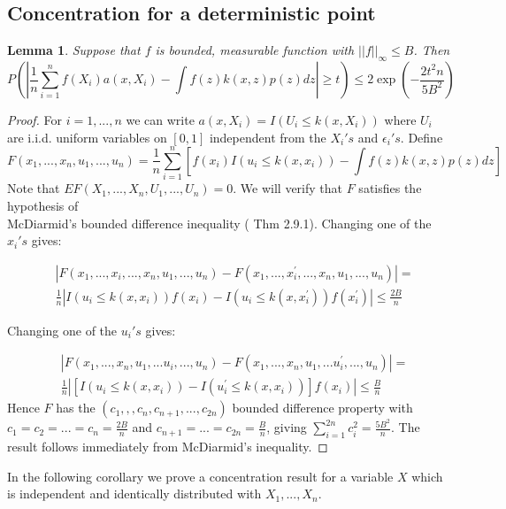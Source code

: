 \documentclass{article}
\newtheorem{lemma}[theorem]{Lemma}
\begin{document}
\subsection{Concentration for a deterministic point}
\label{conc_det_pt}

\begin{lemma}
\label{basic_lemma_1}
Suppose that $f$ is bounded, measurable function with  $||f||_{\infty}\leq B$. Then 
\begin{equation*}
P(|\frac{1}{n}\sum_{i=1}^n f(X_i)a(x,X_i)-\int f(z)k(x,z)p(z)dz|\geq t)\leq 2\exp(-\frac{2t^2n}{5B^2})
\end{equation*}
\end{lemma}
\begin{proof} For $i=1,...,n$ we can write $a(x,X_i)=I(U_i\leq k(x,X_i))$ where $U_i$ are i.i.d. uniform  variables on $[0,1]$ independent from the $X_i's$ and $\epsilon_i's$. Define
\begin{equation*}
    F(x_1,...,x_n,u_1,...,u_n)=\frac{1}{n}\sum_{i=1}^n [f(x_i)I(u_i\leq k(x,x_i))-\int f(z)k(x,z)p(z)dz]
\end{equation*}
Note that $EF(X_1,...,X_n,U_1,...,U_n)=0$.
We will verify that $F$ satisfies the hypothesis of \\
McDiarmid's bounded difference inequality (\cite{vershynin} Thm 2.9.1). Changing one of the $x_i's$ gives:

\begin{equation*}
\begin{split}
    &|F(x_1,...,x_i,...,x_n,u_1,...,u_n)-F(x_1,...,x^{'}_i,...,x_n,u_1,...,u_n)|=\\
    &\frac{1}{n}|I(u_i\leq k(x,x_i))f(x_i)-I(u_i\leq k(x,x^{'}_i))f(x^{'}_i)|\leq \frac{2B}{n}
\end{split}
\end{equation*}

Changing one of the $u_i's$ gives:

\begin{equation*}
\begin{split}
        &|F(x_1,...,x_n,u_1,...u_i,...,u_n)-F(x_1,...,x_n,u_1,...u^{'}_i,...,u_n)|=\\
    &\frac{1}{n}|[I(u_i\leq k(x,x_i))-I(u^{'}_i\leq k(x,x_i))]f(x_i)|\leq \frac{B}{n}
\end{split}
\end{equation*}
Hence $F$ has the $(c_1,,,c_n,c_{n+1},...,c_{2n})$ bounded difference property with $c_1=c_2=...=c_n=\frac{2B}{n}$ and $c_{n+1}=...=c_{2n}=\frac{B}{n}$, giving $\sum_{i=1}^{2n}c_i^2=\frac{5B^2}{n}$. The result follows immediately from McDiarmid's inequality.
\end{proof}
In the following corollary we prove a concentration result for a variable $X$ which is independent and identically distributed with $X_1,...,X_n$.
\end{document}
